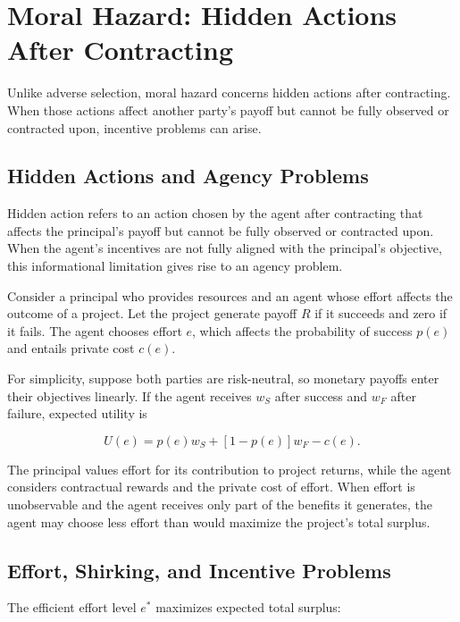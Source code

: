\section{Moral Hazard: Hidden Actions After Contracting}

Unlike adverse selection, moral hazard concerns hidden actions after contracting. When those actions affect another party's payoff but cannot be fully observed or contracted upon, incentive problems can arise.

\subsection{Hidden Actions and Agency Problems}

Hidden action refers to an action chosen by the agent after contracting that affects the principal's payoff but cannot be fully observed or contracted upon. When the agent's incentives are not fully aligned with the principal's objective, this informational limitation gives rise to an agency problem.

Consider a principal who provides resources and an agent whose effort affects the outcome of a project. Let the project generate payoff $R$ if it succeeds and zero if it fails. The agent chooses effort $e$, which affects the probability of success $p(e)$ and entails private cost $c(e)$.

For simplicity, suppose both parties are risk-neutral, so monetary payoffs enter their objectives linearly. If the agent receives $w_S$ after success and $w_F$ after failure, expected utility is

\begin{equation}
U(e)=p(e)w_S+[1-p(e)]w_F-c(e).
\label{eq:ch3-agent-utility}
\end{equation}

The principal values effort for its contribution to project returns, while the agent considers contractual rewards and the private cost of effort. When effort is unobservable and the agent receives only part of the benefits it generates, the agent may choose less effort than would maximize the project's total surplus.

\subsection{Effort, Shirking, and Incentive Problems}

The efficient effort level $e^*$ maximizes
expected total surplus:

